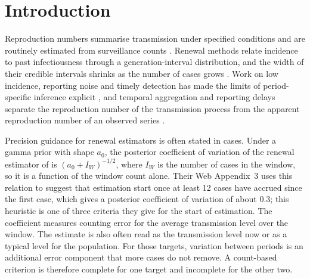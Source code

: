 \section{Introduction}
\label{sec:intro}

Reproduction numbers summarise transmission under specified conditions and are routinely estimated from surveillance counts \citep{fraser2007estimating, gostic2020practical}. Renewal methods relate incidence to past infectiousness through a generation-interval distribution, and the width of their credible intervals shrinks as the number of cases grows \citep{cori2013new, thompson2019improved}. Work on low incidence, reporting noise and timely detection has made the limits of period-specific inference explicit \citep{parag2021improved, parag2022quantifying, parag2025asymmetric}, and temporal aggregation and reporting delays separate the reproduction number of the transmission process from the apparent reproduction number of an observed series \citep{nash2023estimating, ogigittins2024simulation, eales2024differences}.

Precision guidance for renewal estimators is often stated in cases. Under a gamma prior with shape $a_0$, the posterior coefficient of variation of the renewal estimator of \citet{cori2013new} is $(a_0+I_W)^{-1/2}$, where $I_W$ is the number of cases in the window, so it is a function of the window count alone. Their Web Appendix~3 uses this relation to suggest that estimation start once at least 12 cases have accrued since the first case, which gives a posterior coefficient of variation of about 0.3; this heuristic is one of three criteria they give for the start of estimation. The coefficient measures counting error for the average transmission level over the window. The estimate is also often read as the transmission level now or as a typical level for the population. For those targets, variation between periods is an additional error component that more cases do not remove. A count-based criterion is therefore complete for one target and incomplete for the other two.

